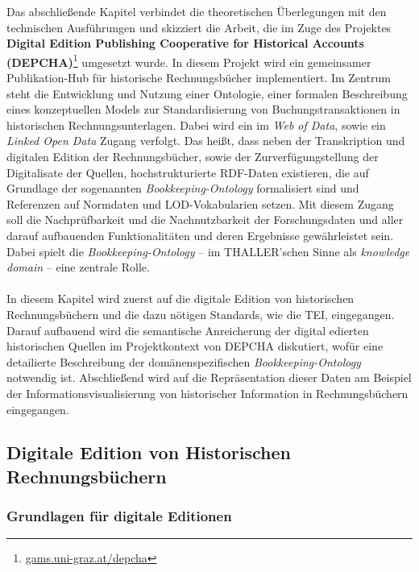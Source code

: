\documentclass[12pt,a4paper]{article}
\begin{document}
Das abschließende Kapitel verbindet die theoretischen Überlegungen mit den technischen Ausführungen und skizziert die Arbeit, die im Zuge des Projektes \textbf{Digital Edition Publishing Cooperative for Historical Accounts (DEPCHA)}\footnote{\url{gams.uni-graz.at/depcha}} umgesetzt wurde. In diesem Projekt wird ein gemeinsamer Publikation-Hub für historische Rechnungsbücher implementiert. Im Zentrum steht die Entwicklung und Nutzung einer Ontologie, einer formalen Beschreibung eines konzeptuellen Models zur Standardisierung von Buchungstransaktionen in historischen Rechnungsunterlagen. Dabei wird ein im \textit{Web of Data}, sowie ein \textit{Linked Open Data} Zugang verfolgt. Das heißt, dass neben der Transkription und digitalen Edition der Rechnungsbücher, sowie der Zurverfügungstellung der Digitalisate der Quellen, hochstrukturierte RDF-Daten existieren, die auf Grundlage der sogenannten \textit{Bookkeeping-Ontology} formalisiert sind und Referenzen auf Normdaten und LOD-Vokabularien setzen. Mit diesem Zugang soll die Nachprüfbarkeit und die Nachnutzbarkeit der Forschungsdaten und aller darauf aufbauenden Funktionalitäten und deren Ergebnisse gewährleistet sein. Dabei spielt die \textit{Bookkeeping-Ontology} -- im THALLER'schen Sinne als \textit{knowledge domain} -- eine zentrale Rolle.
\\
\\
In diesem Kapitel wird zuerst auf die digitale Edition von historischen Rechnungsbüchern und die dazu nötigen Standards, wie die TEI, eingegangen. Darauf aufbauend wird die semantische Anreicherung der digital edierten historischen Quellen im Projektkontext von DEPCHA diskutiert, wofür eine detailierte Beschreibung der domänenspezifischen \textit{Bookkeeping-Ontology} notwendig ist. Abschließend wird auf die Repräsentation dieser Daten am Beispiel der Informationsvisualisierung von historischer Information in Rechnungsbüchern eingegangen.

\subsection{Digitale Edition von Historischen Rechnungsbüchern}
\subsubsection{Grundlagen für digitale Editionen}
\end{document}
